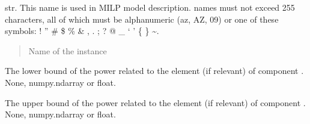 \documentclass[letterpaper,10pt,english]{sphinxmanual}
\begin{document}
\begin{fulllineitems}
\begin{fulllineitems}
\end{fulllineitems}


\begin{fulllineitems}
\label{\detokenize{generated/tamos.InterfaceMask:tamos.InterfaceMask.name}}
\pysigstartsignatures
{}
\pysigstopsignatures
\sphinxAtStartPar
str.
This name is used in MILP model description.
names must not exceed 255 characters,
all of which must be alphanumeric (a\sphinxhyphen{}z, A\sphinxhyphen{}Z, 0\sphinxhyphen{}9) or one of these symbols:
! ” \# \$ \% \& , . ; ? @ \_ ‘ ’ \{ \} \textasciitilde{}.
\begin{quote}\begin{description}
\sphinxAtStartPar
Name of the instance

\end{description}\end{quote}

\end{fulllineitems}


\begin{fulllineitems}
\label{\detokenize{generated/tamos.InterfaceMask:tamos.InterfaceMask.power_lb}}
\pysigstartsignatures
{}
\pysigstopsignatures
\sphinxAtStartPar
The lower bound of the power related to the element  (if relevant) of component .
None, numpy.ndarray or float.

\end{fulllineitems}


\begin{fulllineitems}
\label{\detokenize{generated/tamos.InterfaceMask:tamos.InterfaceMask.power_ub}}
\pysigstartsignatures
{}
\pysigstopsignatures
\sphinxAtStartPar
The upper bound of the power related to the element  (if relevant) of component .
None, numpy.ndarray or float.

\end{fulllineitems}


\end{fulllineitems}
\end{document}
